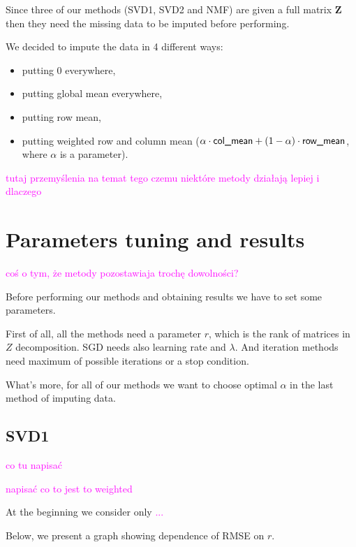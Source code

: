 \documentclass[11pt]{amsart}
\newcommand{\tami}[1]{{\textcolor{magenta}{#1}}}
\begin{document}
Since three of our methods (SVD1, SVD2 and NMF) are given a full matrix $\boldsymbol{Z}$ then they need the missing data to be imputed before performing.

We decided to impute the data in 4 different ways:
\begin{itemize}
    \item putting 0 everywhere,
    \item putting global mean everywhere,
    \item putting row mean,
    \item putting weighted row and column mean ($\alpha \cdot \text{\textsf{col\_mean}} + (1-\alpha) \cdot \text{\textsf{row\_mean}}$, where $\alpha$ is a parameter).
\end{itemize}

\tami{tutaj przemyślenia na temat tego czemu niektóre metody działają lepiej i dlaczego}

\section{Parameters tuning and results}

\tami{coś o tym, że metody pozostawiaja trochę dowolności?}

Before performing our methods and obtaining results we have to set some parameters.

First of all, all the methods need a parameter $r$, which is the rank of matrices in $Z$ decomposition.
SGD needs also learning rate and $\lambda$.
And iteration methods need maximum of possible iterations or a stop condition.

What's more, for all of our methods we want to choose optimal $\alpha$ in the last method of imputing data.



\subsection*{SVD1}

\tami{co tu napisać}

\tami{napisać co to jest to weighted}

At the beginning we consider only \tami{...}

Below, we present a graph showing dependence of RMSE on $r$.
\end{document}
